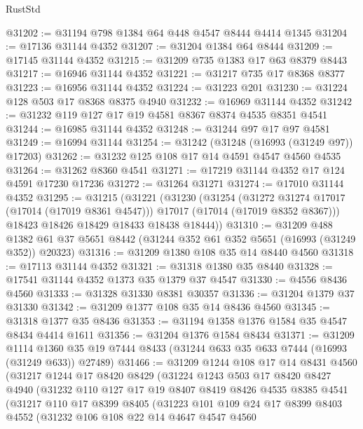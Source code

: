\begin{lexlean}{RustStd}
\begin{coremodule}
@31202 := @31194 @798 @1384 @64 @448 @4547 @8444 @4414 @1345
@31204 := @17136 @31144 @4352
@31207 := @31204 @1384 @64 @8444
@31209 := @17145 @31144 @4352
@31215 := @31209 @735 @1383 @17 @63 @8379 @8443
@31217 := @16946 @31144 @4352
@31221 := @31217 @735 @17 @8368 @8377
@31223 := @16956 @31144 @4352
@31224 := @31223 @201
@31230 := @31224 @128 @503 @17 @8368 @8375 @4940
@31232 := @16969 @31144 @4352
@31242 := @31232 @119 @127 @17 @19 @4581 @8367 @8374 @4535 @8351 @4541
@31244 := @16985 @31144 @4352
@31248 := @31244 @97 @17 @97 @4581
@31249 := @16994 @31144
@31254 := @31242 (@31248 (@16993 (@31249 @97)) @17203)
@31262 := @31232 @125 @108 @17 @14 @4591 @4547 @4560 @4535
@31264 := @31262 @8360 @4541
@31271 := @17219 @31144 @4352 @17 @124 @4591 @17230 @17236
@31272 := @31264 @31271
@31274 := @17010 @31144 @4352
@31295 := @31215
    (@31221
      (@31230
        (@31254
          (@31272 @31274 @17017 (@17014 (@17019 @8361 @4547)))
          @17017
          (@17014 (@17019 @8352 @8367)))
        @18423
        @18426
        @18429
        @18433
        @18438
        @18444))
@31310 := @31209
    @488
    @1382
    @61
    @37
    @5651
    @8442
    (@31244 @352 @61 @352 @5651 (@16993 (@31249 @352)) @20323)
@31316 := @31209 @1380 @108 @35 @14 @8440 @4560
@31318 := @17113 @31144 @4352
@31321 := @31318 @1380 @35 @8440
@31328 := @17541 @31144 @4352 @1373 @35 @1379 @37 @4547
@31330 := @4556 @8436 @4560
@31333 := @31328 @31330 @8381 @30357
@31336 := @31204 @1379 @37 @31330
@31342 := @31209 @1377 @108 @35 @14 @8436 @4560
@31345 := @31318 @1377 @35 @8436
@31353 := @31194 @1358 @1376 @1584 @35 @4547 @8434 @4414 @1611
@31356 := @31204 @1376 @1584 @8434
@31371 := @31209
    @1114
    @1360
    @35
    @19
    @7444
    @8433
    (@31244 @633 @35 @633 @7444 (@16993 (@31249 @633)) @27489)
@31466 := @31209
    @1244
    @108
    @17
    @14
    @8431
    @4560
    (@31217
      @1244
      @17
      @8420
      @8429
      (@31224
        @1243
        @503
        @17
        @8420
        @8427
        @4940
        (@31232
          @110
          @127
          @17
          @19
          @8407
          @8419
          @8426
          @4535
          @8385
          @4541
          (@31217
            @110
            @17
            @8399
            @8405
            (@31223
              @101
              @109
              @24
              @17
              @8399
              @8403
              @4552
              (@31232
                @106
                @108
                @22
                @14
                @4647
                @4547
                @4560

\end{coremodule}
\end{lexlean}
